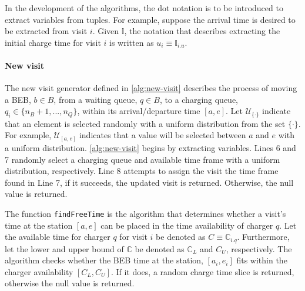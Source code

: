 \documentclass[ee,thesis]{usuthesis}
\newcommand{\I}{\mathbb{I}}                 %
\newcommand{\C}{\mathbb{C}}                 %
\newcommand{\U}{\mathcal{U}}                %
\begin{document}
In the development of the algorithms, the dot notation is to be introduced to extract variables from tuples. For
example, suppose the arrival time is desired to be extracted from visit \(i\). Given \(\I\), the notation that describes
extracting the initial charge time for visit \(i\) is written as \(u_i \equiv \I_{i.u}\).

\paragraph{New visit}
\label{sec:new-visit}
The new visit generator defined in \ref{alg:new-visit} describes the process of moving a BEB, \(b \in B\), from a waiting
queue, \(q \in B\), to a charging queue, \(q_i \in \{n_B + 1, ..., n_Q\}\), within its arrival/departure time \([a, e]\). Let
\(\U_{\{\cdot\}}\) indicate that an element is selected randomly with a uniform distribution from the set \(\{\cdot\}\). For
example, \(\U_{[a, e]}\) indicates that a value will be selected between \(a\) and \(e\) with a uniform distribution.
\ref{alg:new-visit} begins by extracting variables. Lines 6 and 7 randomly select a charging queue and available time
frame with a uniform distribution, respectively. Line 8 attempts to assign the visit the time frame found in Line 7, if
it succeeds, the updated visit is returned. Otherwise, the null value is returned.

The function \texttt{findFreeTime} is the algorithm that determines whether a visit's time at the station \([a, e]\) can be placed
in the time availability of charger \(q\). Let the available time for charger \(q\) for visit \(i\) be denoted as \(C \equiv
\C_{i.q}\). Furthermore, let the lower and upper bound of \(\C\) be denoted as \(\C_L\) and \(C_U\), respectively. The
algorithm checks whether the BEB time at the station, \([a_i, e_i]\) fits within the charger availability \([C_L, C_U]\). If
it does, a random charge time slice is returned, otherwise the null value is returned.
\end{document}
